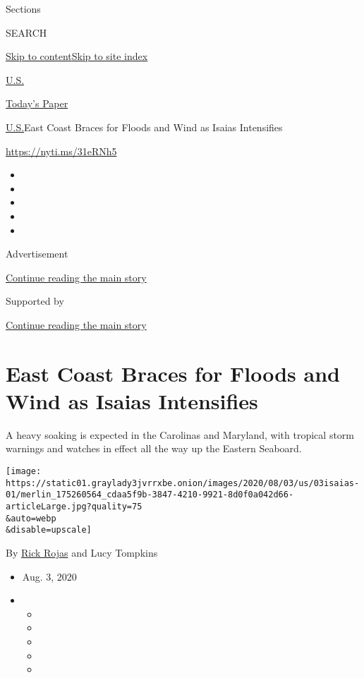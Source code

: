 Sections

SEARCH

\protect\hyperlink{site-content}{Skip to
content}\protect\hyperlink{site-index}{Skip to site index}

\href{https://www.nytimes3xbfgragh.onion/section/us}{U.S.}

\href{https://myaccount.nytimes3xbfgragh.onion/auth/login?response_type=cookie\&client_id=vi}{}

\href{https://www.nytimes3xbfgragh.onion/section/todayspaper}{Today's
Paper}

\href{/section/us}{U.S.}\textbar{}East Coast Braces for Floods and Wind
as Isaias Intensifies

\url{https://nyti.ms/31eRNh5}

\begin{itemize}
\item
\item
\item
\item
\item
\end{itemize}

Advertisement

\protect\hyperlink{after-top}{Continue reading the main story}

Supported by

\protect\hyperlink{after-sponsor}{Continue reading the main story}

\hypertarget{east-coast-braces-for-floods-and-wind-as-isaias-intensifies}{%
\section{East Coast Braces for Floods and Wind as Isaias
Intensifies}\label{east-coast-braces-for-floods-and-wind-as-isaias-intensifies}}

A heavy soaking is expected in the Carolinas and Maryland, with tropical
storm warnings and watches in effect all the way up the Eastern
Seaboard.

\texttt{[image: https://static01.graylady3jvrrxbe.onion/images/2020/08/03/us/03isaias-01/merlin\_175260564\_cdaa5f9b-3847-4210-9921-8d0f0a042d66-articleLarge.jpg?quality=75\\\&auto=webp\\\&disable=upscale]}

By \href{https://www.nytimes3xbfgragh.onion/by/rick-rojas}{Rick Rojas}
and Lucy Tompkins

\begin{itemize}
\item
  Aug. 3, 2020
\item
  \begin{itemize}
  \item
  \item
  \item
  \item
  \item
  \end{itemize}
\end{itemize}

